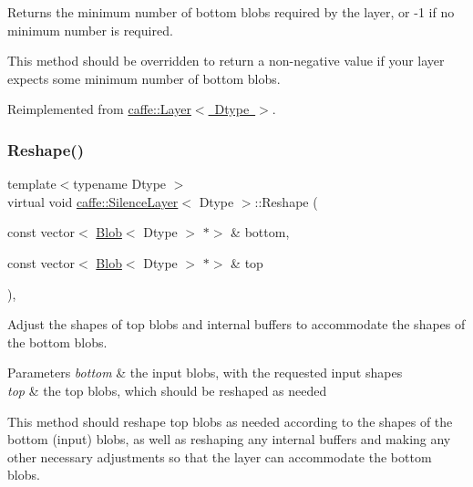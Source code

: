 Returns the minimum number of bottom blobs required by the layer, or -\/1 if no minimum number is required. 

This method should be overridden to return a non-\/negative value if your layer expects some minimum number of bottom blobs. 

Reimplemented from \mbox{\hyperlink{classcaffe_1_1_layer_aca3cb2bafaefda5d4760aaebd0b72def}{caffe\+::\+Layer$<$ Dtype $>$}}.

\mbox{\label{classcaffe_1_1_silence_layer_a96a47a49a103e60a681f97eff7bf42f2}} 
\subsubsection{\texorpdfstring{Reshape()}{Reshape()}\hspace{0.1cm}{\footnotesize\ttfamily [1/2]}}
{\footnotesize\ttfamily template$<$typename Dtype $>$ \\
virtual void \mbox{\hyperlink{classcaffe_1_1_silence_layer}{caffe\+::\+Silence\+Layer}}$<$ Dtype $>$\+::Reshape (\begin{DoxyParamCaption}\item[{const vector$<$ \mbox{\hyperlink{classcaffe_1_1_blob}{Blob}}$<$ Dtype $>$ $\ast$$>$ \&}]{bottom,  }\item[{const vector$<$ \mbox{\hyperlink{classcaffe_1_1_blob}{Blob}}$<$ Dtype $>$ $\ast$$>$ \&}]{top }\end{DoxyParamCaption})\hspace{0.3cm}{\ttfamily [inline]}, {\ttfamily [virtual]}}



Adjust the shapes of top blobs and internal buffers to accommodate the shapes of the bottom blobs. 


\begin{DoxyParams}{Parameters}
{\em bottom} & the input blobs, with the requested input shapes \\
\hline
{\em top} & the top blobs, which should be reshaped as needed\\
\hline
\end{DoxyParams}
This method should reshape top blobs as needed according to the shapes of the bottom (input) blobs, as well as reshaping any internal buffers and making any other necessary adjustments so that the layer can accommodate the bottom blobs. 

